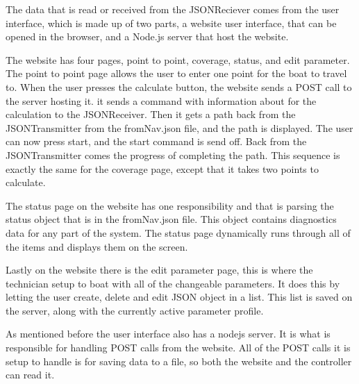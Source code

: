 The data that is read or received from the JSONReciever comes from the user interface, which is made up of two parts, a website user interface, that can be opened in the browser, and a Node.js server that host the website. 

The website has four pages, point to point, coverage, status, and edit parameter. The point to point page allows the user to enter one point for the boat to travel to. When the user presses the calculate button, the website sends a POST call to the server hosting it. it sends a command with information about for the calculation to the JSONReceiver. Then it gets a path back from the JSONTransmitter from the fromNav.json file, and the path is displayed. The user can now press start, and the start command is send off. Back from the JSONTransmitter comes the progress of completing the path. This sequence is exactly the same for the coverage page, except that it takes two points to calculate. 

The status page on the website has one responsibility and that is parsing the status object that is in the fromNav.json file. This object contains diagnostics data for any part of the system. The status page dynamically runs through all of the items and displays them on the screen.

Lastly on the website there is the edit parameter page, this is where the technician setup to boat with all of the changeable parameters. It does this by letting the user create, delete and edit JSON object in a list. This list is saved on the server, along with the currently active parameter profile. 

As mentioned before the user interface also has a nodejs server\cite{nodejs}. It is what is responsible for handling POST calls from the website. All of the POST calls it is setup to handle is for saving data to a file, so both the website and the controller can read it.



